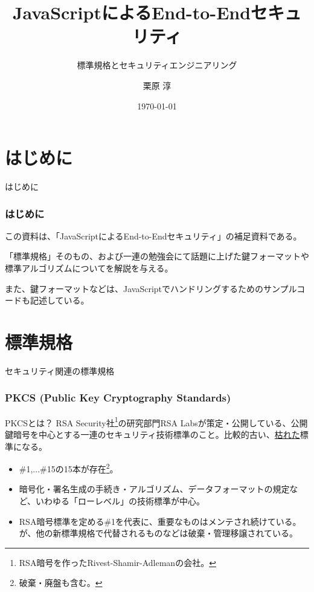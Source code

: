 \documentclass[12pt,dvipdfmx]{beamer}
\title[E2E Security with JS Appendix]{JavaScriptによるEnd-to-Endセキュリティ}
\subtitle{標準規格とセキュリティエンジニアリング}
\author[Jun Kurihara]{栗原 淳}
\institute[]{}
\date[\today]{\today}
\begin{document}
\begin{frame}
\titlepage
\end{frame}

\section{はじめに}
\begin{frame}
 \centering
 {\Large はじめに}
\end{frame}

\begin{frame}
\frametitle{はじめに}
この資料は、「JavaScriptによるEnd-to-Endセキュリティ」の補足資料である。

「標準規格」そのもの、および一連の勉強会にて話題に上げた鍵フォーマットや標準アルゴリズムについてを解説を与える。

また、鍵フォーマットなどは、JavaScriptでハンドリングするためのサンプルコードも記述している。
\end{frame}

\section{標準規格}
\begin{frame}
\centering
 {\Large セキュリティ関連の標準規格}
\end{frame}

\begin{frame}
\frametitle{PKCS (Public Key Cryptography Standards)}
\begin{block}{PKCSとは？}
RSA Security社\footnote[frame]{\scriptsize RSA暗号を作ったRivest-Shamir-Adlemanの会社。}の研究部門RSA Labsが策定・公開している、公開鍵暗号を中心とする一連のセキュリティ技術標準のこと。比較的古い、\underline{枯れた}標準になる。
\end{block}
\begin{itemize}
 \item \#1,...\#15の15本が存在\footnote[frame]{\scriptsize 破棄・廃盤も含む。}。
 \item 暗号化・署名生成の手続き・アルゴリズム、データフォーマットの規定など、いわゆる「ローレベル」の技術標準が中心。
 \item RSA暗号標準を定める\#1を代表に、重要なものはメンテされ続けている。が、他の新標準規格で代替されるものなどは破棄・管理移譲されている。
\end{itemize}
\end{frame}
\end{document}
